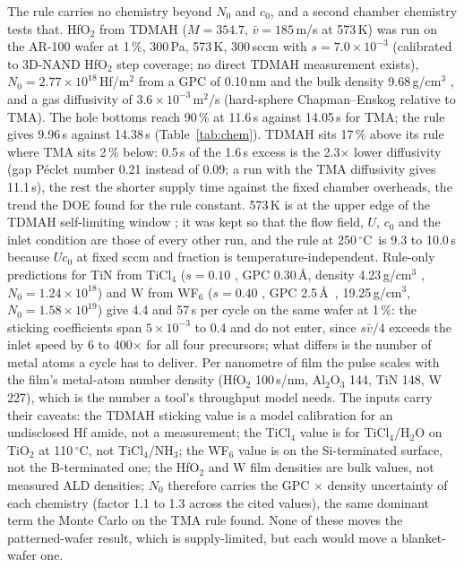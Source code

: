 \documentclass[11pt,letterpaper]{article}
\newcommand{\degC}{$^{\circ}$C}
\begin{document}
The rule carries no chemistry beyond $N_0$ and $c_0$, and a second chamber chemistry tests that. HfO$_2$ from TDMAH ($M = 354.7$, $\bar{v} = 185$\,m/s at 573\,K) was run on the AR-100 wafer at 1\,\%, 300\,Pa, 573\,K, 300\,sccm with $s = 7.0\times10^{-3}$ \cite{reiter2024} (calibrated to 3D-NAND HfO$_2$ step coverage; no direct TDMAH measurement exists), $N_0 = 2.77\times10^{18}$\,Hf/m$^2$ from a GPC of 0.10\,nm \cite{blaschke2020,gieraltowska2023} and the bulk density 9.68\,g/cm$^3$ \cite{delabie2005}, and a gas diffusivity of $3.6\times10^{-3}$\,m$^2$/s (hard-sphere Chapman--Enskog relative to TMA). The hole bottoms reach 90\,\% at 11.6\,s against 14.05\,s for TMA; the rule gives 9.96\,s against 14.38\,s (Table~\ref{tab:chem}). TDMAH sits 17\,\% above its rule where TMA sits 2\,\% below: 0.5\,s of the 1.6\,s excess is the 2.3$\times$ lower diffusivity (gap P\'eclet number 0.21 instead of 0.09; a run with the TMA diffusivity gives 11.1\,s), the rest the shorter supply time against the fixed chamber overheads, the trend the DOE found for the rule constant. 573\,K is at the upper edge of the TDMAH self-limiting window \cite{blaschke2020,gieraltowska2023,hausmann2002}; it was kept so that the flow field, $U$, $c_0$ and the inlet condition are those of every other run, and the rule at 250\,\degC\ is 9.3 to 10.0\,s because $U c_0$ at fixed sccm and fraction is temperature-independent. Rule-only predictions for TiN from TiCl$_4$ ($s = 0.10$ \cite{ylilammi2018}, GPC 0.30\,\AA, density 4.23\,g/cm$^3$ \cite{kinnunen2017}, $N_0 = 1.24\times10^{18}$) and W from WF$_6$ ($s = 0.40$ \cite{elam2001}, GPC 2.5\,\AA\ \cite{klaus2000}, 19.25\,g/cm$^3$, $N_0 = 1.58\times10^{19}$) give 4.4 and 57\,s per cycle on the same wafer at 1\,\%: the sticking coefficients span $5\times10^{-3}$ to 0.4 and do not enter, since $s\bar{v}/4$ exceeds the inlet speed by 6 to 400$\times$ for all four precursors; what differs is the number of metal atoms a cycle has to deliver. Per nanometre of film the pulse scales with the film's metal-atom number density (HfO$_2$ 100\,s/nm, Al$_2$O$_3$ 144, TiN 148, W 227), which is the number a tool's throughput model needs. The inputs carry their caveats: the TDMAH sticking value is a model calibration for an undisclosed Hf amide, not a measurement; the TiCl$_4$ value is for TiCl$_4$/H$_2$O on TiO$_2$ at 110\,\degC, not TiCl$_4$/NH$_3$; the WF$_6$ value is on the Si-terminated surface, not the B-terminated one; the HfO$_2$ and W film densities are bulk values, not measured ALD densities; $N_0$ therefore carries the GPC $\times$ density uncertainty of each chemistry (factor 1.1 to 1.3 across the cited values), the same dominant term the Monte Carlo on the TMA rule found. None of these moves the patterned-wafer result, which is supply-limited, but each would move a blanket-wafer one.
\end{document}
